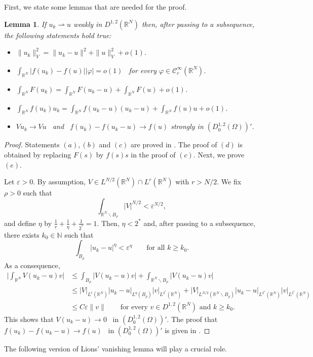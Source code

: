 \documentclass[10pt,letterpaper]{article}
\newtheorem{lemma}[theorem]{Lemma}
\numberwithin{equation}{section}
\def\r{\mathbb{R}}
\def\rn{\mathbb{R}^N}
\def\n{\mathbb{N}}
\def\eps{\varepsilon}
\def\rh{\rightharpoonup}
\def\irn{\int_{\r^N}}
\def\vp{\varphi}
\def\o{\Omega}
\def\cC{\mathcal{C}}
\begin{document}
First, we state some lemmas that are needed for the proof.

\begin{lemma}\label{lem:cm} 
If $u_k\rh u$ weakly in $D^{1,2}(\rn)$ then, after passing to a subsequence, the following statements hold true:
\begin{itemize}
\item[$(a)$] $\|u_k\|_V^2 = \|u_k -u\|^2 + \|u\|_V^2 + o(1).$
\item[$(b)$] $\irn |f(u_k) - f(u)| |\vp|=o(1)$ \ for every $\vp\in\cC^{\infty}_{c}(\rn)$.
\item[$(c)$] $\irn F(u_k) = \irn F(u_k - u) + \irn F(u) + o(1)$.
\item[$(d)$] $\irn f(u_k)u_k = \irn f(u_k - u)(u_k-u) + \irn f(u)u + o(1)$.
\item[$(e)$] $Vu_k\to Vu$ \ and \ $f(u_k) - f(u_k -u) \to f(u)$  strongly in $(D^{1,2}_0(\o))'$.
\end{itemize}
\end{lemma}

\begin{proof}
Statements $(a),(b)$ and $(c)$ are proved in \cite[Lemma 3.8]{cm}. The proof of $(d)$ is obtained by replacing $F(s)$ by $f(s)s$ in the proof of $(c)$. Next, we prove $(e)$.

Let $\eps>0$. By assumption, $V\in L^{N/2}(\rn)\cap L^r(\rn)$ with $r>N/2$. We fix $\rho>0$ such that 
$$\int_{\rn\smallsetminus B_\rho}|V|^{N/2}<\eps^{N/2},$$ 
and define $\eta$ by $\frac{1}{r}+\frac{1}{\eta}+\frac{1}{2^*}=1$. Then, $\eta<2^*$ and, after passing to a subsequence, there exists $k_0\in\n$ such that 
$$\int_{B_\rho}|u_k-u|^\eta<\eps^\eta\qquad\text{for all \ }k\geq k_0.$$
As a consequence,
\begin{align*}
\Big|\irn V(u_k-u)v\Big|&\leq \int_{B_\rho}|V(u_k-u)v|+\int_{\rn\smallsetminus B_\rho}|V(u_k-u)v|\\
&\leq |V|_{L^r(\rn)}|u_k-u|_{L^\eta(B_\rho)}|v|_{L^{2^*}(\rn)} + |V|_{L^{N/2}(\rn\smallsetminus B_\rho)}|u_k-u|_{L^{2^*}(\rn)}|v|_{L^{2^*}(\rn)}\\
&\leq C\eps\|v\|\qquad\text{for every \ }v\in D^{1,2}(\rn)\text{ \ and \ }k\geq k_0.
\end{align*}
This shows that $V(u_k-u)\to 0$ \ in $(D^{1,2}_0(\o))'$. The proof that \ $f(u_k) - f(u_k -u) \to f(u)$ \ in $(D^{1,2}_0(\o))'$ is given in \cite[Lemma 3.8]{cm}. 
\end{proof}

The following version of Lions' vanishing lemma will play a crucial role.
\end{document}
